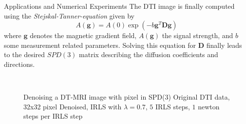 \begin{chapter}{Applications and Numerical Experiments}
The DTI image is finally computed using the \emph{Stejskal-Tanner-equation} given by
\begin{equation}
    A(\mathbf{g})=A(0)\exp(-b\mathbf{g}^T\mathbf{D}\mathbf{g})
\end{equation}
where $\mathbf{g}$ denotes the magnetic gradient field, $A(\mathbf{g})$ the signal strength, and $b$ some measurement related parameters. Solving this equation for $\mathbf{D}$ finally
leads to the desired $SPD(3)$ matrix describing the diffusion coefficients and directions.\\
\begin{figure}[h!]
    \centering
    \\
    \caption[Denoising DT-MRI data]{Denoising a DT-MRI image with pixel in SPD(3)
	 Original DTI data, 32x32 pixel
	 Denoised, IRLS with $\lambda=0.7$, $5$ IRLS steps, $1$ newton steps per IRLS step
	\label{fig:application_dti1}
    }
\end{figure}


\end{chapter}
